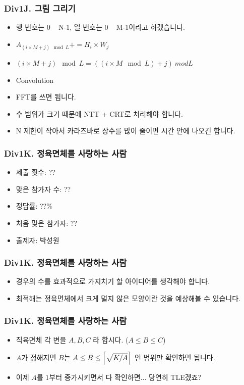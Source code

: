 \documentclass[xetex]{beamer}
\DeclarePairedDelimiter\ceil{\lceil}{\rceil}
\begin{document}
\begin{frame}
  \frametitle{Div1J. 그림 그리기}
  \begin{itemize}
    \item 행 번호는 0 ~ N-1, 열 번호는 0 ~ M-1이라고 하겠습니다.
    \item $A_{(i \times M + j) \mod L} += H_i \times W_j$
    \item $(i \times M + j) \mod L = ((i \times M \mod L) + j) \ mod L$
    \item Convolution
    \item FFT를 쓰면 됩니다.
    \item 수 범위가 크기 때문에 NTT + CRT로 처리해야 합니다.
    \item N 제한이 작아서 카라츠바로 상수를 많이 줄이면 시간 안에 나오긴 합니다.
  \end{itemize}
\end{frame}

\begin{frame}
  \frametitle{Div1K. 정육면체를 사랑하는 사람}
  \begin{itemize}
    \item 제출 횟수: ??
    \item 맞은 참가자 수: ??
    \item 정답률: ??\%
    \item 처음 맞은 참가자: ??
    \item 출제자: 박성원
  \end{itemize}
\end{frame}

\begin{frame}
  \frametitle{Div1K. 정육면체를 사랑하는 사람}
  \begin{itemize}
    \item 경우의 수를 효과적으로 가지치기 할 아이디어를 생각해야 합니다.
    \item 최적해는 정육면체에서 크게 멀지 않은 모양이란 것을 예상해볼 수 있습니다.
  \end{itemize}
\end{frame}

\begin{frame}
  \frametitle{Div1K. 정육면체를 사랑하는 사람}
  \begin{itemize}
    \item 직육면체 각 변을 $A, B, C$ 라 합시다. ($A \le B \le C$)
    \item $A$가 정해지면 $B$는  $A \le B \le \ceil*{\sqrt{K/A}}$ 인 범위만 확인하면 됩니다.
    \item 이제 $A$를 $1$부터 증가시키면서 다 확인하면... 당연히 TLE겠죠?
  \end{itemize}
\end{frame}
\end{document}
